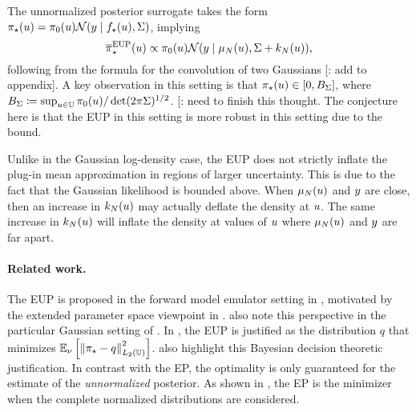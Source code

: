 \documentclass[12pt]{article}
\begin{document}
The unnormalized posterior surrogate takes the form 
${\pi}_{\star}(u) = \pi_0(u)\mathcal{N}(y \mid {f}_{\star}(u), \Sigma)$, implying
\begin{equation}
{\overline{\pi}}_{\star}^{\mathrm{EUP}}(u) \propto \pi_0(u) \mathcal{N}(y \mid \mu_{N}(u), \Sigma + k_{N}(u)),
\label{eq:EUP-Gaussian-fwd}
\end{equation}
following from the formula for the convolution of two Gaussians [\todo: add to appendix].
A key observation in this setting is that ${\pi}_{\star}(u) \in [0, B_{\Sigma}]$, where 
$B_{\Sigma} \coloneqq \sup_{u \in \mathbb{U}} \pi_0(u) / \det(2\pi\Sigma)^{1/2}$.
[\todo: need to finish this thought. The conjecture here is that the EUP in this setting is 
more robust in this setting due to the bound.

Unlike in the Gaussian log-density case, the EUP does not strictly inflate the plug-in 
mean approximation in regions of larger uncertainty. This is due to the fact that 
the Gaussian likelihood is bounded above. When $\mu_{N}(u)$ and $y$
are close, then an increase in $k_{N}(u)$ may actually deflate the density 
at $u$. The same increase in $k_{N}(u)$ will inflate the density at values 
of $u$ where $\mu_{N}(u)$ and $y$ are far apart.
 
\paragraph{Related work.} The EUP is proposed in the forward model emulator setting 
in \citet{BilionisBayesSurrogates}, motivated by the extended parameter space viewpoint
in . \citet{StuartTeck2,CES} also note this perspective
in the particular Gaussian setting of .
In \citet{SinsbeckNowak}, the EUP is justified as the distribution 
$q$ that minimizes $\mathbb{E}_{\nu}\left[\left\lVert{\pi}_{\star} - q\right\rVert_{L_2(\mathbb{U})}^2 \right]$.
\citet{StuartTeck1,StuartTeck2,VehtariParallelGP} also highlight this Bayesian 
decision theoretic justification. 
In contrast with the EP, the optimality is only guaranteed for the estimate of the 
\textit{unnormalized} posterior.
As shown in , the EP is the minimizer when the complete 
normalized distributions are considered.
\end{document}
